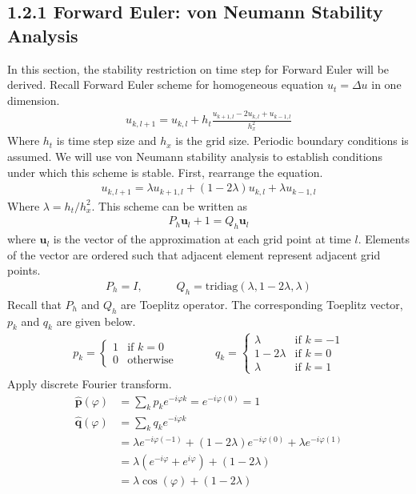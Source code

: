 \documentclass[11pt, letterpaper, hidelinks]{article}
\theoremstyle{definition}
\begin{document}
\subsection{1.2.1 Forward Euler: von Neumann Stability Analysis}
In this section, the stability restriction on time step for Forward Euler will be derived. Recall Forward Euler scheme for homogeneous equation $u_t = \Delta u$ in one dimension.
\begin{align*}
    u_{k,l+1} = u_{k,l} + h_t\frac{u_{k+1,l}-2u_{k,l}+u_{k-1,l}}{h_x^2}
\end{align*}
Where $h_t$ is time step size and $h_x$ is the grid size. Periodic boundary conditions is assumed. We will use von Neumann stability analysis to establish conditions under which this scheme is stable. First, rearrange the equation.
\begin{align*}
    u_{k,l+1} = \lambda u_{k+1,l} + (1-2\lambda) u_{k,l} + \lambda u_{k-1,l}
\end{align*}
Where $\lambda = h_t/h_x^2$. This scheme can be written as
\begin{align*}
    P_h\textbf{u}_l+1 = Q_h\textbf{u}_l
\end{align*}
where $\textbf{u}_l$ is the vector of the approximation at each grid point at time $l$. Elements of the vector are ordered such that adjacent element represent adjacent grid points.
\begin{align*}
    P_h = I, \quad\quad\quad Q_h=\text{tridiag}\left( \lambda, 1-2\lambda, \lambda  \right)
\end{align*}
Recall that $P_h$ and $Q_h$ are Toeplitz operator. The corresponding Toeplitz vector, $p_k$ and $q_k$ are given below.
\begin{align*}
    p_k =
    \left\{
    \begin{array}{ll}
        1 & \mbox{if } k = 0  \\
        0 & \mbox{otherwise }
    \end{array}
    \right. \quad\quad\quad
    q_k =
    \left\{
    \begin{array}{ll}
        \lambda    & \mbox{if } k = -1 \\
        1-2\lambda & \mbox{if } k =  0 \\
        \lambda    & \mbox{if } k =  1
    \end{array}
    \right.
\end{align*}
Apply discrete Fourier transform.
\begin{align*}
    \hat{\textbf{p}}(\varphi) & = \sum_{k}p_k e^{-i\varphi k} = e^{-i\varphi (0)} = 1                \\
    \hat{\textbf{q}}(\varphi) & = \sum_{k}q_k e^{-i\varphi k}                                        \\
                              & = \lambda  e^{-i\varphi (-1)}
    + \left(  1 - 2\lambda \right)  e^{-i\varphi (0)}
    + \lambda  e^{-i\varphi (1)}                                                                     \\
                              & = \lambda \left( e^{-i\varphi} + e^{i\varphi} \right) + (1-2\lambda) \\
                              & = \lambda \cos(\varphi) + (1-2\lambda)
\end{align*}
\end{document}
